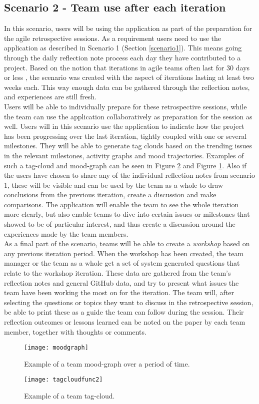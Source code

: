 \subsection{Scenario 2 - Team use after each iteration}
\label{scenario2}
In this scenario, users will be using the application as part of the preparation for the agile retrospective sessions. As a requirement users need to use the application as described in Scenario 1 (Section \ref{scenario1}). This means going through the daily reflection note process each day they have contributed to a project. Based on the notion that iterations in agile teams often last for 30 days or less \citep{scrumguide}, the scenario was created with the aspect of iterations lasting at least two weeks each. This way enough data can be gathered through the reflection notes, and experiences are still fresh. \\
Users will be able to individually prepare for these retrospective sessions, while the team can use the application collaboratively as preparation for the session as well.
Users will in this scenario use the application to indicate how the project has been progressing over the last iteration, tightly coupled with one or several milestones. They will be able to generate tag clouds based on the trending issues in the relevant milestones, activity graphs and mood trajectories. Examples of such a tag-cloud and mood-graph can be seen in Figure \ref{tagcloudfuncscenario} and Figure \ref{moodgraphscenario}. Also if the users have chosen to share any of the individual reflection notes from scenario 1, these will be visible and can be used by the team as a whole to draw conclusions from the previous iteration, create a discussion and make comparisons. The application will enable the team to see the whole iteration more clearly, but also enable teams to dive into certain issues or milestones that showed to be of particular interest, and thus create a discussion around the experiences made by the team members. \\

As a final part of the scenario, teams will be able to create a \emph{workshop} based on any previous iteration period. When the workshop has been created, the team manager or the team as a whole get a set of system generated questions that relate to the workshop iteration. These data are gathered from the team's reflection notes and general GitHub data, and try to present what issues the team have been working the most on for the iteration. The team will, after selecting the questions or topics they want to discuss in the retrospective session, be able to print these as a guide the team can follow during the session. Their reflection outcomes or lessons learned can be noted on the paper by each team member, together with thoughts or comments.
\begin{figure}[H]
\centering
	\texttt{[image: moodgraph]}
\caption{Example of a team mood-graph over a period of time.}
\label{moodgraphscenario}
\end{figure}
\begin{figure}[H]
\centering
	\texttt{[image: tagcloudfunc2]}
\caption{Example of a team tag-cloud.}
\label{tagcloudfuncscenario}
\end{figure}
